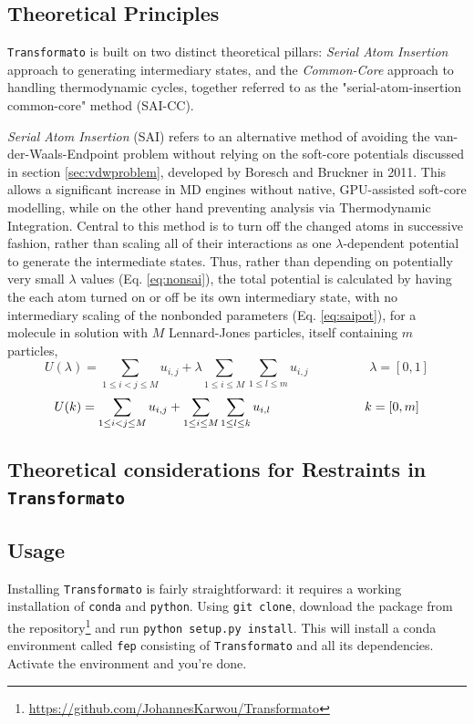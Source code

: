 \documentclass[oneside]{scrreprt}
\begin{document}
\subsection{Theoretical Principles} \label{sec:tf_principles}
\texttt{Transformato} is built on two distinct theoretical pillars: \emph{Serial Atom Insertion} approach to generating intermediary states, and the \emph{Common-Core} approach to handling thermodynamic cycles, together referred to as the "serial-atom-insertion common-core" method (SAI-CC).

\emph{Serial Atom Insertion} (SAI)\cite{boresch_avoiding_2011} refers to an alternative method of avoiding the van-der-Waals-Endpoint problem without relying on the soft-core potentials discussed in section \ref{sec:vdwproblem}, developed by Boresch and Bruckner in 2011. This allows a significant increase in MD engines without native, GPU-assisted soft-core modelling, while on the other hand preventing analysis via Thermodynamic Integration. Central to this method is to turn off the changed atoms in successive fashion, rather than scaling all of their interactions as one $\lambda$-dependent potential to generate the intermediate states. Thus, rather than depending on potentially very small $\lambda$ values (Eq. \ref{eq:nonsai}), the total potential is calculated by having the each atom turned on or off be its own intermediary state, with no intermediary scaling of the nonbonded parameters (Eq. \ref{eq:saipot}), for a molecule in solution with $M$ Lennard-Jones particles, itself containing $m$ particles,
\begin{equation}\label{eq:nonsai}
    U(\lambda)=\sum_{1\leq i<j \leq M} u_{i,j}+\lambda \sum_{1 \leq i \leq M} \sum_{1 \leq l \leq m} u_{i,j} \hspace{2cm} \lambda=[0,1]
\end{equation}
\begin{equation}\label{eq:saipot}
    U(k)=\sum_{1\leq i<j \leq M} u_{i,j}+\sum_{1 \leq i \leq M} \sum_{1 \leq l \leq k} u_{i,l} \hspace{2.6cm} k=[0,m]
\end{equation}
\subsection{Theoretical considerations for Restraints in \texttt{Transformato}}
\subsection{Usage}
Installing \texttt{Transformato} is fairly straightforward: it requires a working installation of \texttt{conda} and \texttt{python}. Using \texttt{git clone}, download the package from the repository\footnote{\url{https://github.com/JohannesKarwou/Transformato}} and run \texttt{python setup.py install}. This will install a conda environment called \texttt{fep} consisting of \texttt{Transformato} and all its dependencies. Activate the environment and you're done.
\end{document}
